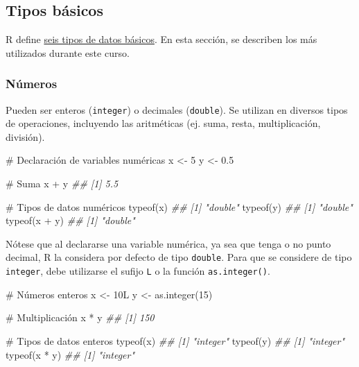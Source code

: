 \documentclass[
  letterpaper,
  DIV=11,
  numbers=noendperiod]{scrreprt}
\newenvironment{Shaded}{\begin{snugshade}}{\end{snugshade}}
\newcommand{\CommentTok}[1]{\textcolor[rgb]{0.37,0.37,0.37}{#1}}
\newcommand{\DecValTok}[1]{\textcolor[rgb]{0.68,0.00,0.00}{#1}}
\newcommand{\DocumentationTok}[1]{\textcolor[rgb]{0.37,0.37,0.37}{\textit{#1}}}
\newcommand{\FloatTok}[1]{\textcolor[rgb]{0.68,0.00,0.00}{#1}}
\newcommand{\FunctionTok}[1]{\textcolor[rgb]{0.28,0.35,0.67}{#1}}
\newcommand{\NormalTok}[1]{\textcolor[rgb]{0.00,0.23,0.31}{#1}}
\newcommand{\OtherTok}[1]{\textcolor[rgb]{0.00,0.23,0.31}{#1}}
\newcommand{\SpecialCharTok}[1]{\textcolor[rgb]{0.37,0.37,0.37}{#1}}
\begin{document}
\hypertarget{tipos-buxe1sicos}{%
\subsection{Tipos básicos}\label{tipos-buxe1sicos}}

R define
\href{https://cran.r-project.org/doc/manuals/r-release/R-lang.html\#Basic-types}{seis
tipos de datos básicos}. En esta sección, se describen los más
utilizados durante este curso.

\hypertarget{nuxfameros}{%
\subsubsection{Números}\label{nuxfameros}}

Pueden ser enteros (\texttt{integer}) o decimales (\texttt{double}). Se
utilizan en diversos tipos de operaciones, incluyendo las aritméticas
(ej. suma, resta, multiplicación, división).

\begin{Shaded}
\begin{Highlighting}[]
\CommentTok{\# Declaración de variables numéricas}
\NormalTok{x }\OtherTok{\textless{}{-}} \DecValTok{5}
\NormalTok{y }\OtherTok{\textless{}{-}} \FloatTok{0.5}

\CommentTok{\# Suma}
\NormalTok{x }\SpecialCharTok{+}\NormalTok{ y}
\DocumentationTok{\#\# [1] 5.5}

\CommentTok{\# Tipos de datos numéricos}
\FunctionTok{typeof}\NormalTok{(x)}
\DocumentationTok{\#\# [1] "double"}
\FunctionTok{typeof}\NormalTok{(y)}
\DocumentationTok{\#\# [1] "double"}
\FunctionTok{typeof}\NormalTok{(x }\SpecialCharTok{+}\NormalTok{ y)}
\DocumentationTok{\#\# [1] "double"}
\end{Highlighting}
\end{Shaded}

Nótese que al declararse una variable numérica, ya sea que tenga o no
punto decimal, R la considera por defecto de tipo \texttt{double}. Para
que se considere de tipo \texttt{integer}, debe utilizarse el sufijo
\texttt{L} o la función \texttt{as.integer()}.

\begin{Shaded}
\begin{Highlighting}[]
\CommentTok{\# Números enteros}
\NormalTok{x }\OtherTok{\textless{}{-}}\NormalTok{ 10L}
\NormalTok{y }\OtherTok{\textless{}{-}} \FunctionTok{as.integer}\NormalTok{(}\DecValTok{15}\NormalTok{)}

\CommentTok{\# Multiplicación}
\NormalTok{x }\SpecialCharTok{*}\NormalTok{ y}
\DocumentationTok{\#\# [1] 150}

\CommentTok{\# Tipos de datos enteros}
\FunctionTok{typeof}\NormalTok{(x)}
\DocumentationTok{\#\# [1] "integer"}
\FunctionTok{typeof}\NormalTok{(y)}
\DocumentationTok{\#\# [1] "integer"}
\FunctionTok{typeof}\NormalTok{(x }\SpecialCharTok{*}\NormalTok{ y)}
\DocumentationTok{\#\# [1] "integer"}
\end{Highlighting}
\end{Shaded}
\end{document}
